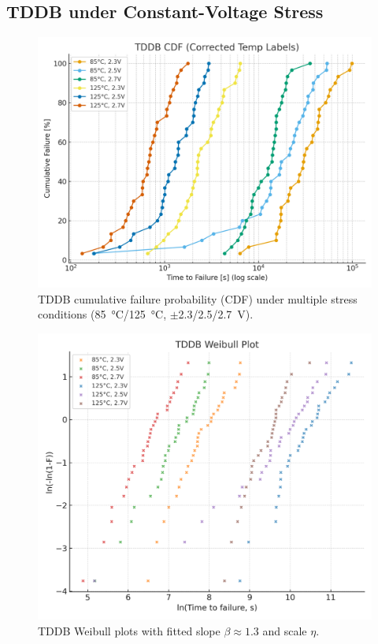 \documentclass[conference]{IEEEtran}
\begin{document}
\subsection{TDDB under Constant-Voltage Stress}
\begin{figure}[!t]
  \centering
  \includegraphics[width=0.95\linewidth]{figures/fig4_tddb_cdf.png}
  \caption{TDDB cumulative failure probability (CDF) under multiple stress conditions (\SI{85}{\celsius}/\SI{125}{\celsius}, $\pm$2.3/2.5/2.7~V).}
  \label{fig:tddb_cdf}
\end{figure}

\begin{figure}[!t]
  \centering
  \includegraphics[width=0.95\linewidth]{figures/fig4_tddb_weibull.png}
  \caption{TDDB Weibull plots with fitted slope $\beta \approx 1.3$ and scale $\eta$.}
  \label{fig:tddb_weibull}
\end{figure}
\end{document}
